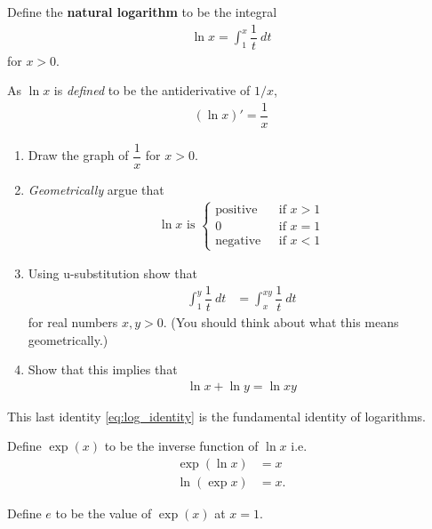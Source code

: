 \begin{definition}
	Define the {\bf natural logarithm} to be the integral
		\begin{align*}
			\ln x = \int_1^x \dfrac{1}{t} \: dt
		\end{align*}
		for $x > 0$.
\end{definition}
\begin{remark}
	As $\ln x$ is {\it defined} to be the antiderivative of $ 1 / x$,
	\begin{align*}
		\left(\ln x\right)'= \dfrac{1}{x}
	\end{align*}
\end{remark}
\begin{exercise}
	\begin{enumerate}
		\item Draw the graph of $\dfrac{1}{x}$ for $x > 0$.
		\item {\it Geometrically} argue that
			\begin{align*}
				\ln x \mbox{ is }
				\begin{cases}
					\mbox{positive } & \mbox{ if } x > 1\\
					0 & \mbox{ if } x = 1\\
						\mbox{negative } & \mbox{ if } x < 1
				\end{cases}
			\end{align*}
		\item Using u-substitution show that
		\begin{align*}
			\int_1^y \dfrac{1}{t} \: dt
			&=
			\int_x^{xy} \dfrac{1}{t} \: dt
		\end{align*}
		for real numbers $x , y > 0$. (You should think about what this means geometrically.)
		\item Show that this implies that
		\begin{align}
			\label{eq:log_identity}
			\ln x + \ln y = \ln xy
		\end{align}
	\end{enumerate}
\end{exercise}
This last identity \eqref{eq:log_identity} is the fundamental identity of logarithms.

\begin{definition}
	Define $\exp(x)$ to be the inverse function of $\ln x$ i.e.
	\begin{align*}
		\exp(\ln x) &= x \\
		\ln(\exp x) &= x.
	\end{align*}
\end{definition}
\begin{definition}
	Define $e$ to be the value of $\exp(x)$ at $x = 1$.
\end{definition}


